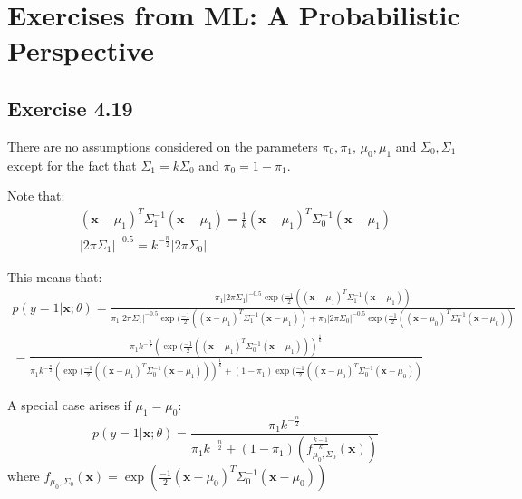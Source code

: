 \documentclass{article}
\newcommand{\vct}[1]{\mathbf{#1}}
\begin{document}
\section*{Exercises from ML: A Probabilistic Perspective}
\subsection*{Exercise 4.19}
\begin{flushleft}
There are no assumptions considered on the parameters \(\pi_{0}, \pi_{1}\), \(\mu_{0}, \mu_{1}\) and \(\Sigma_{0}, \Sigma_{1}\) except for the fact that \(\Sigma_{1} = k\Sigma_{0}\) and \(\pi_{0} = 1 - \pi_{1}\).

Note that:
\begin{gather}
(\vct{x} - \mu_{1})^{T}\Sigma_{1}^{-1}(\vct{x} - \mu_{1}) = \frac{1}{k}(\vct{x} - \mu_{1})^{T}\Sigma_{0}^{-1}(\vct{x} - \mu_{1})\\
|2\pi \Sigma_{1}|^{-0.5} = k^{-\frac{n}{2}} |2\pi \Sigma_{0}|
\end{gather}

This means that:
\begin{multline}
p(y = 1 | \vct{x}; \theta) = \frac{\pi_{1}|2\pi \Sigma_{1}|^{-0.5} \exp(\frac{-1}{2}\left((\vct{x} - \mu_{1})^{T}\Sigma_{1}^{-1}(\vct{x} - \mu_{1})\right)}{\pi_{1}|2\pi \Sigma_{1}|^{-0.5} \exp(\frac{-1}{2}\left((\vct{x} - \mu_{1})^{T}\Sigma_{1}^{-1}(\vct{x} - \mu_{1})\right) + \pi_{0}|2\pi \Sigma_{0}|^{-0.5} \exp(\frac{-1}{2}\left((\vct{x} - \mu_{0})^{T}\Sigma_{0}^{-1}(\vct{x} - \mu_{0})\right)}\\= \frac{\pi_{1}k^{-\frac{n}{2}} \left(\exp(\frac{-1}{2}\left((\vct{x} - \mu_{1})^{T}\Sigma_{0}^{-1}(\vct{x} - \mu_{1})\right)\right)^{\frac{1}{k}}}{\pi_{1}k^{-\frac{n}{2}} \left(\exp(\frac{-1}{2}\left((\vct{x} - \mu_{1})^{T}\Sigma_{0}^{-1}(\vct{x} - \mu_{1})\right)\right)^{\frac{1}{k}} + (1 - \pi_{1}) \exp(\frac{-1}{2}\left((\vct{x} - \mu_{0})^{T}\Sigma_{0}^{-1}(\vct{x} - \mu_{0})\right)}
\end{multline}

A special case arises if \(\mu_{1} = \mu_{0}\):
\begin{equation}
p(y = 1 | \vct{x} ; \theta) = \frac{\pi_{1} k^{-\frac{n}{2}}}{\pi_{1} k^{-\frac{n}{2}} + (1 - \pi_{1}) (f^{\frac{k - 1}{k}}_{\mu_{0}, \Sigma_{0}}(\vct{x}))}
\end{equation}
where \(f_{\mu_{0}, \Sigma_{0}}(\vct{x}) = \exp(\frac{-1}{2}(\vct{x} - \mu_{0})^{T}\Sigma_{0}^{-1}(\vct{x} - \mu_{0}))\)
\end{flushleft}
\end{document}
